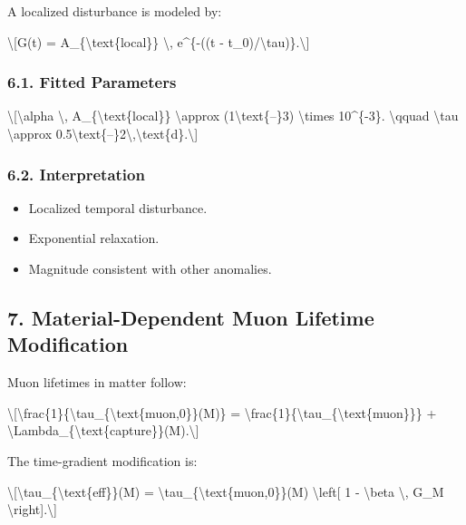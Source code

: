 \documentclass[
  10pt,
]{article}
\providecommand{\tightlist}{%
  \setlength{\itemsep}{0pt}\setlength{\parskip}{0pt}}
\begin{document}
A localized disturbance is modeled by:

\textbackslash{[}G(t) = A\_\{\textbackslash text\{local\}\}
\textbackslash, e\^{}\{-((t -
t\_0)/\textbackslash tau)\}.\textbackslash{]}

\hypertarget{fitted-parameters-1}{%
\subsubsection{6.1. Fitted Parameters}\label{fitted-parameters-1}}

\textbackslash{[}\textbackslash alpha \textbackslash,
A\_\{\textbackslash text\{local\}\} \textbackslash approx
(1\textbackslash text\{--\}3) \textbackslash times 10\^{}\{-3\}.
\textbackslash qquad \textbackslash tau \textbackslash approx
0.5\textbackslash text\{--\}2\textbackslash,\textbackslash text\{d\}.\textbackslash{]}

\hypertarget{interpretation-2}{%
\subsubsection{6.2. Interpretation}\label{interpretation-2}}

\begin{itemize}
\tightlist
\item
  Localized temporal disturbance.
\item
  Exponential relaxation.
\item
  Magnitude consistent with other anomalies.
\end{itemize}

\hypertarget{material-dependent-muon-lifetime-modification}{%
\subsection{7. Material-Dependent Muon Lifetime
Modification}\label{material-dependent-muon-lifetime-modification}}

Muon lifetimes in matter follow:

\textbackslash{[}\textbackslash frac\{1\}\{\textbackslash tau\_\{\textbackslash text\{muon,0\}\}(M)\}
=
\textbackslash frac\{1\}\{\textbackslash tau\_\{\textbackslash text\{muon\}\}\}
+
\textbackslash Lambda\_\{\textbackslash text\{capture\}\}(M).\textbackslash{]}

The time-gradient modification is:

\textbackslash{[}\textbackslash tau\_\{\textbackslash text\{eff\}\}(M) =
\textbackslash tau\_\{\textbackslash text\{muon,0\}\}(M)
\textbackslash left{[} 1 - \textbackslash beta \textbackslash, G\_M
\textbackslash right{]}.\textbackslash{]}
\end{document}

